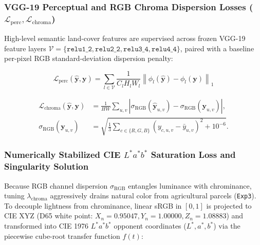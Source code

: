 \documentclass[10pt,a4paper,twoside]{article}
\begin{document}
\subsubsection{VGG-19 Perceptual and RGB Chroma Dispersion Losses (\texorpdfstring{$\mathcal{L}_{\mathrm{perc}}, \mathcal{L}_{\mathrm{chroma}}$}{perceptual and chroma losses})}
High-level semantic land-cover features are supervised across frozen VGG-19 \cite{ref19, ref20} feature layers $\mathcal{V} = \{\texttt{relu1\_2}, \texttt{relu2\_2}, \texttt{relu3\_4}, \texttt{relu4\_4}\}$, paired with a baseline per-pixel RGB standard-deviation dispersion penalty:

\begin{equation}
    \mathcal{L}_{\mathrm{perc}}(\hat{\mathbf{y}}, \mathbf{y}) = \sum_{l \in \mathcal{V}} \frac{1}{C_l H_l W_l}\left\|\phi_l(\hat{\mathbf{y}}) - \phi_l(\mathbf{y})\right\|_1
    \label{eq:perc}
\end{equation}

\begin{equation}
    \begin{aligned}
        \mathcal{L}_{\mathrm{chroma}}(\hat{\mathbf{y}},\mathbf{y})
        &= \frac{1}{HW}\sum_{u,v}
        \left|\sigma_{\mathrm{RGB}}(\hat{\mathbf{y}}_{u,v})
        -\sigma_{\mathrm{RGB}}(\mathbf{y}_{u,v})\right|,\\
        \sigma_{\mathrm{RGB}}(\mathbf{y}_{u,v})
        &= \sqrt{\frac{1}{3}\sum_{c\in\{R,G,B\}}
        (y_{c,u,v}-\bar y_{u,v})^2+10^{-6}}.
    \end{aligned}
    \label{eq:chroma}
\end{equation}

\subsubsection{Numerically Stabilized CIE \texorpdfstring{$L^*a^*b^*$}{Lab} Saturation Loss and Singularity Solution}
Because RGB channel dispersion $\sigma_{\mathrm{RGB}}$ entangles luminance with chrominance, tuning $\lambda_{\mathrm{chroma}}$ aggressively drains natural color from agricultural parcels (\texttt{Exp3}). To decouple lightness from chrominance, linear sRGB in $[0, 1]$ is projected to CIE XYZ (D65 white point: $X_n = 0.95047, Y_n = 1.00000, Z_n = 1.08883$) and transformed into CIE 1976 $L^*a^*b^*$ opponent coordinates ($L^*, a^*, b^*$) via the piecewise cube-root transfer function $f(t)$:
\end{document}
